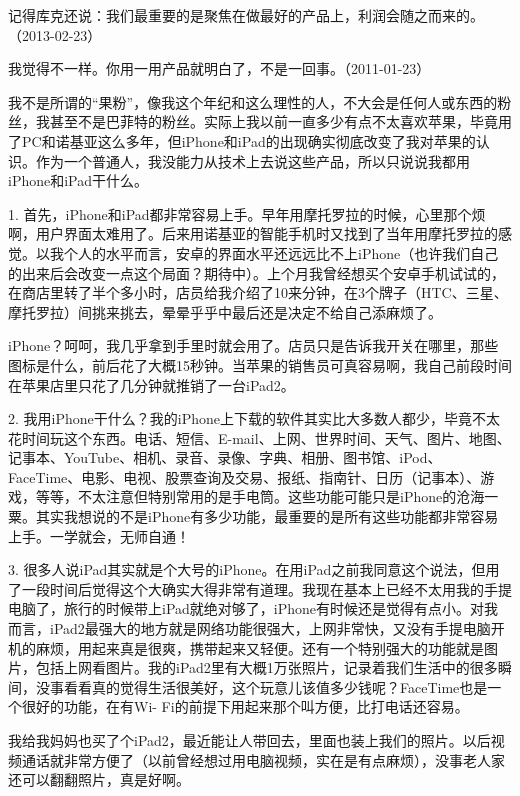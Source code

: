 记得库克还说：我们最重要的是聚焦在做最好的产品上，利润会随之而来的。（2013-02-23）


我觉得不一样。你用一用产品就明白了，不是一回事。（2011-01-23）

我不是所谓的“果粉”，像我这个年纪和这么理性的人，不大会是任何人或东西的粉丝，我甚至不是巴菲特的粉丝。实际上我以前一直多少有点不太喜欢苹果，毕竟用了PC和诺基亚这么多年，但iPhone和iPad的出现确实彻底改变了我对苹果的认识。作为一个普通人，我没能力从技术上去说这些产品，所以只说说我都用iPhone和iPad干什么。

1. 首先，iPhone和iPad都非常容易上手。早年用摩托罗拉的时候，心里那个烦啊，用户界面太难用了。后来用诺基亚的智能手机时又找到了当年用摩托罗拉的感觉。以我个人的水平而言，安卓的界面水平还远远比不上iPhone（也许我们自己的出来后会改变一点这个局面？期待中）。上个月我曾经想买个安卓手机试试的，在商店里转了半个多小时，店员给我介绍了10来分钟，在3个牌子（HTC、三星、摩托罗拉）间挑来挑去，晕晕乎乎中最后还是决定不给自己添麻烦了。

iPhone？呵呵，我几乎拿到手里时就会用了。店员只是告诉我开关在哪里，那些图标是什么，前后花了大概15秒钟。当苹果的销售员可真容易啊，我自己前段时间在苹果店里只花了几分钟就推销了一台iPad2。

2. 我用iPhone干什么？我的iPhone上下载的软件其实比大多数人都少，毕竟不太花时间玩这个东西。电话、短信、E-mail、上网、世界时间、天气、图片、地图、记事本、YouTube、相机、录音、录像、字典、相册、图书馆、iPod、FaceTime、电影、电视、股票查询及交易、报纸、指南针、日历（记事本）、游戏，等等，不太注意但特别常用的是手电筒。这些功能可能只是iPhone的沧海一粟。其实我想说的不是iPhone有多少功能，最重要的是所有这些功能都非常容易上手。一学就会，无师自通！

3. 很多人说iPad其实就是个大号的iPhone。在用iPad之前我同意这个说法，但用了一段时间后觉得这个大确实大得非常有道理。我现在基本上已经不太用我的手提电脑了，旅行的时候带上iPad就绝对够了，iPhone有时候还是觉得有点小。对我而言，iPad2最强大的地方就是网络功能很强大，上网非常快，又没有手提电脑开机的麻烦，用起来真是很爽，携带起来又轻便。还有一个特别强大的功能就是图片，包括上网看图片。我的iPad2里有大概1万张照片，记录着我们生活中的很多瞬间，没事看看真的觉得生活很美好，这个玩意儿该值多少钱呢？FaceTime也是一个很好的功能，在有Wi- Fi的前提下用起来那个叫方便，比打电话还容易。

我给我妈妈也买了个iPad2，最近能让人带回去，里面也装上我们的照片。以后视频通话就非常方便了（以前曾经想过用电脑视频，实在是有点麻烦），没事老人家还可以翻翻照片，真是好啊。

